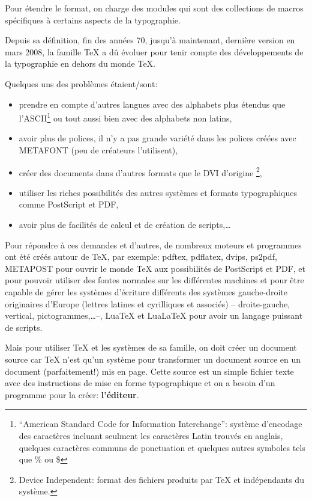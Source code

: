 Pour étendre le format, on charge des \og modules\fg{} qui sont des collections de macros spécifiques à certains aspects de la typographie.

Depuis sa définition, fin des années 70, jusqu'à maintenant, dernière version en mars 2008, la famille \TeX{} a dû évoluer pour tenir compte des développements de la typographie en dehors du monde \TeX.

Quelques uns des problèmes étaient/sont:
\begin{itemize}
\item prendre en compte d'autres langues avec des \og alphabets\fg{} plus étendus que l'ASCII\footnote{``American Standard Code for Information Interchange'': système d'encodage des caractères incluant seulment les caractères Latin trouvés en anglais, quelques caractères communs de ponctuation et quelques autres symboles tels que \% ou \$} ou tout aussi bien avec des alphabets non latins, 
\item avoir plus de polices, il n'y a pas grande variété dans les polices créées avec \textsf{METAFONT} (peu de créateurs l'utilisent), 
\item créer des documents dans d'autres formats que le DVI d'origine \footnote{Device Independent: format des fichiers produits par \TeX{} et indépendants du système.}, 
\item utiliser les riches possibilités des autres systèmes et formats typographiques comme PostScript et PDF, 
\item avoir plus de facilités de calcul et de création de scripts,\dots
\end{itemize}

Pour répondre à ces demandes et d'autres, de nombreux \og moteurs\fg{} et programmes ont été créés autour de \TeX, par exemple: pdftex, pdflatex, dvips, ps2pdf, \textsf{METAPOST} pour ouvrir le monde \TeX{} aux possibilités de PostScript et PDF, \XeTeX{} et {\XeLaTeX} pour pouvoir utiliser des fontes \og normales\fg{} sur les différentes machines et pour être capable de gérer les systèmes d'écriture différents des systèmes gauche-droite originaires d'Europe (lettres latines et cyrilliques et associés) -- droite-gauche, vertical, pictogrammes,\dots --, LuaTeX et LuaLaTeX pour avoir un langage puissant de scripts.

Mais pour utiliser \TeX{} et les systèmes de sa famille, on doit créer un document \og source\fg{} car \TeX{} n'est qu'un système pour transformer un document source en un document (parfaitement!) mis en page. Cette source est un simple fichier texte avec des instructions de mise en forme typographique et on a besoin d'un programme pour la créer: \textbf{l'éditeur}.

